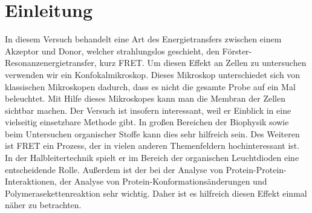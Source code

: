

\chapter{Einleitung}
\label{chap:einleitung}

In diesem Versuch behandelt eine Art des Energietransfers zwischen einem Akzeptor und Donor, welcher strahlungslos geschieht, den Förster-Resonanzenergietransfer, kurz FRET. 
Um diesen Effekt an Zellen zu untersuchen verwenden wir ein Konfokalmikroskop. Dieses Mikroskop unterschiedet sich von klassischen 
Mikroskopen dadurch, dass es nicht die gesamte Probe auf ein Mal beleuchtet. Mit Hilfe dieses Mikroskopes kann man die Membran der Zellen sichtbar machen. 
Der Versuch ist insofern interessant, weil er Einblick in eine vielseitig einsetzbare Methode gibt. In großen Bereichen der Biophysik sowie beim Untersuchen 
organischer Stoffe kann dies sehr hilfreich sein. Des Weiteren ist FRET ein Prozess, der in vielen anderen Themenfeldern hochinteressant ist. In der Halbleitertechnik 
spielt er im Bereich der organischen Leuchtdioden eine entscheidende Rolle. Außerdem ist der bei der Analyse von Protein-Protein-Interaktionen, der Analyse von Protein-Konformationsänderungen 
und Polymerasekettenreaktion sehr wichtig. Daher ist es hilfreich diesen Effekt einmal näher zu betrachten.
